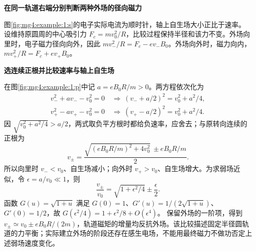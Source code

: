 \begin{solution}\textbf{在同一轨道右端分别判断两种外场的径向磁力}\par\nobreak
图\ref{fig:mg4:example:1:s}的电子实际电流为顺时针，轴上自生场大小正比于速率。设维持原圆周的中心吸引力 $F_c=mv_0^2/R$，比较过程保持半径和该力不变。外场向里时，电子磁力径向向外，因此 $mv_-^2/R=F_c-ev_-B_0$。外场向外时，磁力向内，$mv_+^2/R=F_c+ev_+B_0$。



\par\medskip{}\noindent\textbf{选连续正根并比较速率与轴上自生场}\par\nobreak
在图\ref{fig:mg4:example:1:p}中记 $a=eB_0R/m>0$。两方程依次化为
\[
 \begin{aligned}
 v_-^2+av_--v_0^2=0
 &\ \Longrightarrow\ (v_-+a/2)^2=v_0^2+a^2/4,\\
 v_+^2-av_+-v_0^2=0
 &\ \Longrightarrow\ (v_+-a/2)^2=v_0^2+a^2/4.
 \end{aligned}
\]
因 $\sqrt{v_0^2+a^2/4}>a/2$，两式取负平方根时都给负速率，应舍去；与原转向连续的正根为
\[
v_\pm=\frac{\sqrt{(eB_0R/m)^2+4v_0^2}\ \pm eB_0R/m}{2}.
\]
所以向里时 $v_-<v_0$、自生场减小；向外时 $v_+>v_0$、自生场增大。为求弱场近似，令 $\epsilon=a/v_0\ll1$，则
\[
 \frac{v_\pm}{v_0}=\sqrt{1+\epsilon^2/4}\pm\frac\epsilon2.
\]
函数 $G(u)=\sqrt{1+u}$ 满足 $G(0)=1$、$G'(u)=1/(2\sqrt{1+u})$、$G'(0)=1/2$，故
$G(\epsilon^2/4)=1+\epsilon^2/8+O(\epsilon^4)$。
保留外场的一阶项，得到 $v_\pm\simeq v_0\pm eB_0R/(2m)$，轨道磁矩的增量均反抗外场。该比较描述固定半径圆轨道的力平衡；实际建立外场的阶段还存在感生电场，不能用最终磁力不做功否定上述弱场速度变化。\end{solution}

